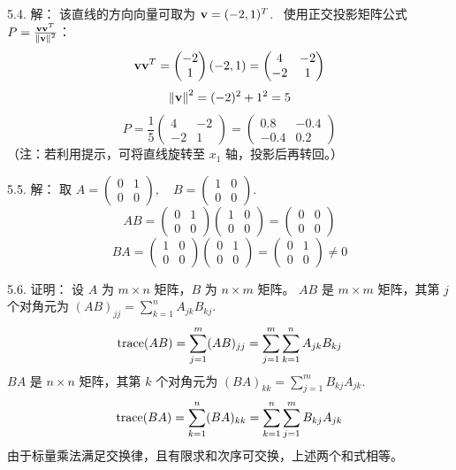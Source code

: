 \begin{exer}
5.4. 解：
该直线的方向向量可取为 $\mathbf{v} = (-2, 1)^T$.~
使用正交投影矩阵公式 $P = \frac{\mathbf{v} \mathbf{v}^T}{\left\lVert\mathbf{v}\right\rVert^2}$：
$$ \mathbf{v} \mathbf{v}^T = \begin{pmatrix} -2 \\ 1 \end{pmatrix} (-2, 1) = \begin{pmatrix} 4 & -2 \\ -2 & 1 \end{pmatrix} $$
$$ \left\lVert\mathbf{v}\right\rVert^2 = (-2)^2 + 1^2 = 5 $$
$$ P = \frac{1}{5} \begin{pmatrix} 4 & -2 \\ -2 & 1 \end{pmatrix} = \begin{pmatrix} 0.8 & -0.4 \\ -0.4 & 0.2 \end{pmatrix} $$
（注：若利用提示，可将直线旋转至 $x_1$ 轴，投影后再转回。）

5.5. 解：
取 $A = \begin{pmatrix} 0 & 1 \\ 0 & 0 \end{pmatrix}, \quad B = \begin{pmatrix} 1 & 0 \\ 0 & 0 \end{pmatrix}$.~
$$ AB = \begin{pmatrix} 0 & 1 \\ 0 & 0 \end{pmatrix} \begin{pmatrix} 1 & 0 \\ 0 & 0 \end{pmatrix} = \begin{pmatrix} 0 & 0 \\ 0 & 0 \end{pmatrix} $$
$$ BA = \begin{pmatrix} 1 & 0 \\ 0 & 0 \end{pmatrix} \begin{pmatrix} 0 & 1 \\ 0 & 0 \end{pmatrix} = \begin{pmatrix} 0 & 1 \\ 0 & 0 \end{pmatrix} \neq 0 $$

5.6. 证明：
设 $A$ 为 $m \times n$ 矩阵，$B$ 为 $n \times m$ 矩阵。
$AB$ 是 $m \times m$ 矩阵，其第 $j$ 个对角元为 $(AB)_{jj} = \sum_{k=1}^n A_{jk} B_{kj}$.~
$$ \operatorname{trace}(AB) = \sum_{j=1}^m (AB)_{jj} = \sum_{j=1}^m \sum_{k=1}^n A_{jk} B_{kj} $$
$BA$ 是 $n \times n$ 矩阵，其第 $k$ 个对角元为 $(BA)_{kk} = \sum_{j=1}^m B_{kj} A_{jk}$.~
$$ \operatorname{trace}(BA) = \sum_{k=1}^n (BA)_{kk} = \sum_{k=1}^n \sum_{j=1}^m B_{kj} A_{jk} $$
由于标量乘法满足交换律，且有限求和次序可交换，上述两个和式相等。


\end{exer}
